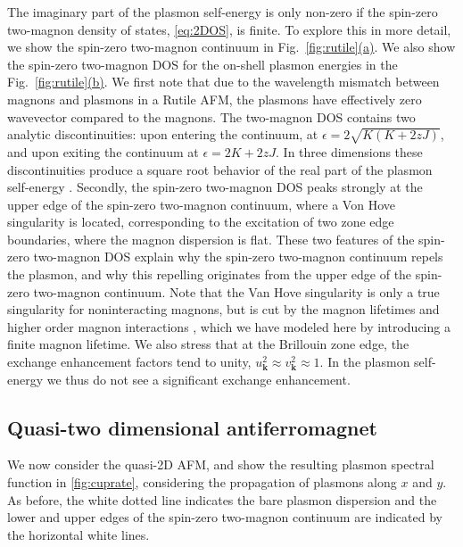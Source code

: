 \documentclass[aps,prb,reprint,twocolumns,superscriptaddress,nofootinbib]{revtex4-2}
\newcommand{\subfigref}[2]{Fig.~\hyperref[#1]{\ref*{#1}#2}}
\begin{document}
	The imaginary part of the plasmon self-energy is only non-zero if the spin-zero two-magnon density of states, \cref{eq:2DOS}, is finite. To explore this in more detail, we show the spin-zero two-magnon continuum in \subfigref{fig:rutile}{(a)}. We also show the spin-zero two-magnon DOS for the on-shell plasmon energies in the \subfigref{fig:rutile}{(b)}. 
	We first note that due to the wavelength mismatch between magnons and plasmons in a Rutile AFM, the plasmons have effectively zero wavevector compared to the magnons.  The two-magnon DOS contains two analytic discontinuities: upon entering the continuum, at $\epsilon=2\sqrt{K(K+2zJ)}$, and upon exiting the continuum at $\epsilon=2K+2zJ$. In three dimensions these discontinuities produce a square root behavior of the real part of the plasmon self-energy \cite{chernyshevSpinWavesTriangular2009,zhitomirskyColloquiumSpontaneousMagnon2013}. Secondly, the spin-zero two-magnon DOS peaks strongly at the upper edge of the spin-zero two-magnon continuum, where a Von Hove singularity is located, corresponding to the excitation of two zone edge boundaries, where the magnon dispersion is flat. 
	These two features of the spin-zero two-magnon DOS explain why the spin-zero two-magnon continuum repels the plasmon, and why this repelling originates from the upper edge of the spin-zero two-magnon continuum. Note that the Van Hove singularity is only a true singularity for noninteracting magnons, but is cut by the magnon lifetimes \cite{bayrakciLifetimesAntiferromagneticMagnons2013} and higher order magnon interactions \cite{canaliTheoryRamanScattering1992}, which we have modeled here by introducing a finite magnon lifetime. We also stress that at the Brillouin zone edge, the exchange enhancement factors tend to unity, $u_{\bm k}^2\approx v_{\bm k}^2 \approx1$.  In the plasmon self-energy we thus do not see a significant exchange enhancement.
	
	
	\subsection{Quasi-two dimensional antiferromagnet}
	
	We now consider the quasi-2D AFM, and show the resulting plasmon spectral function in \cref{fig:cuprate}, considering the propagation of plasmons along $ x$ and $ y$. As before, the white dotted line indicates the bare plasmon dispersion and the lower and upper edges of the spin-zero two-magnon continuum are indicated by the horizontal white lines. 
	
\end{document}
